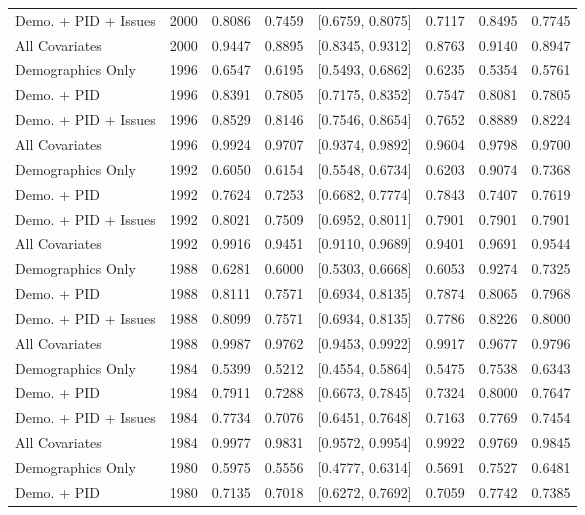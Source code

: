 \begin{longtable}{lrrrlrrr}
  Demo. + PID + Issues & 2000 & 0.8086 & 0.7459 & [0.6759, 0.8075] & 0.7117 & 0.8495 & 0.7745 \\ 
  All Covariates & 2000 & 0.9447 & 0.8895 & [0.8345, 0.9312] & 0.8763 & 0.9140 & 0.8947 \\ 
  Demographics Only & 1996 & 0.6547 & 0.6195 & [0.5493, 0.6862] & 0.6235 & 0.5354 & 0.5761 \\ 
  Demo. + PID & 1996 & 0.8391 & 0.7805 & [0.7175, 0.8352] & 0.7547 & 0.8081 & 0.7805 \\ 
  Demo. + PID + Issues & 1996 & 0.8529 & 0.8146 & [0.7546, 0.8654] & 0.7652 & 0.8889 & 0.8224 \\ 
  All Covariates & 1996 & 0.9924 & 0.9707 & [0.9374, 0.9892] & 0.9604 & 0.9798 & 0.9700 \\ 
  Demographics Only & 1992 & 0.6050 & 0.6154 & [0.5548, 0.6734] & 0.6203 & 0.9074 & 0.7368 \\ 
  Demo. + PID & 1992 & 0.7624 & 0.7253 & [0.6682, 0.7774] & 0.7843 & 0.7407 & 0.7619 \\ 
  Demo. + PID + Issues & 1992 & 0.8021 & 0.7509 & [0.6952, 0.8011] & 0.7901 & 0.7901 & 0.7901 \\ 
  All Covariates & 1992 & 0.9916 & 0.9451 & [0.9110, 0.9689] & 0.9401 & 0.9691 & 0.9544 \\ 
  Demographics Only & 1988 & 0.6281 & 0.6000 & [0.5303, 0.6668] & 0.6053 & 0.9274 & 0.7325 \\ 
  Demo. + PID & 1988 & 0.8111 & 0.7571 & [0.6934, 0.8135] & 0.7874 & 0.8065 & 0.7968 \\ 
  Demo. + PID + Issues & 1988 & 0.8099 & 0.7571 & [0.6934, 0.8135] & 0.7786 & 0.8226 & 0.8000 \\ 
  All Covariates & 1988 & 0.9987 & 0.9762 & [0.9453, 0.9922] & 0.9917 & 0.9677 & 0.9796 \\ 
  Demographics Only & 1984 & 0.5399 & 0.5212 & [0.4554, 0.5864] & 0.5475 & 0.7538 & 0.6343 \\ 
  Demo. + PID & 1984 & 0.7911 & 0.7288 & [0.6673, 0.7845] & 0.7324 & 0.8000 & 0.7647 \\ 
  Demo. + PID + Issues & 1984 & 0.7734 & 0.7076 & [0.6451, 0.7648] & 0.7163 & 0.7769 & 0.7454 \\ 
  All Covariates & 1984 & 0.9977 & 0.9831 & [0.9572, 0.9954] & 0.9922 & 0.9769 & 0.9845 \\ 
  Demographics Only & 1980 & 0.5975 & 0.5556 & [0.4777, 0.6314] & 0.5691 & 0.7527 & 0.6481 \\ 
  Demo. + PID & 1980 & 0.7135 & 0.7018 & [0.6272, 0.7692] & 0.7059 & 0.7742 & 0.7385 \\ 

\end{longtable}
